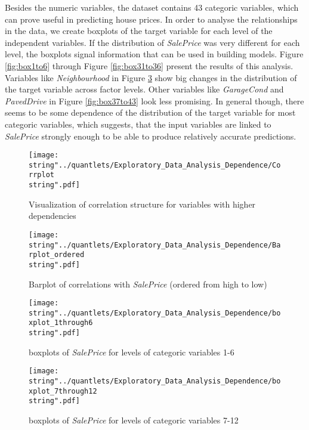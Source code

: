 Besides the numeric variables, the dataset contains 43 categoric variables, which can prove useful in predicting house prices. In order to analyse the relationships in the data, we create boxplots of the target variable for each level of the independent variables. If the distribution of \textit{SalePrice} was very different for each level, the boxplots signal information that can be used in building models. Figure \ref{fig:box1to6} through Figure \ref{fig:box31to36} present the results of this analysis. Variables like \textit{Neighbourhood} in Figure \ref{fig:box7to12} show big changes in the distribution of the target variable across factor levels. Other variables like \textit{GarageCond} and \textit{PavedDrive} in Figure \ref{fig:box37to43} look less promising. In general though, there seems to be some dependence of the distribution of the target variable for most categoric variables, which suggests, that the input variables are  linked to \textit{SalePrice} strongly enough to be able to produce relatively accurate predictions. 
\begin{figure}[H]
  \centering
\texttt{[image: \\string"../quantlets/Exploratory\_Data\_Analysis\_Dependence/Corrplot\\string".pdf]}
  \caption{Visualization of correlation structure for variables with higher dependencies}\label{fig:corrgram}
\end{figure}

\begin{figure}[H]
  \centering
\texttt{[image: \\string"../quantlets/Exploratory\_Data\_Analysis\_Dependence/Barplot\_ordered\\string".pdf]}
  \caption{Barplot of correlations with \textit{SalePrice} (ordered from high to low)}\label{fig:barplot_ordered}
\end{figure}

\begin{figure}[H]
\centering
\begin{minipage}{.5\textwidth}
	\centering
	\texttt{[image: \\string"../quantlets/Exploratory\_Data\_Analysis\_Dependence/boxplot\_1through6\\string".pdf]}
  	\caption{boxplots of \textit{SalePrice} for levels of categoric variables 1-6}
  	\label{fig:box1to6}
\end{minipage}%
\begin{minipage}{.5\textwidth}
\centering
	\texttt{[image: \\string"../quantlets/Exploratory\_Data\_Analysis\_Dependence/boxplot\_7through12\\string".pdf]}
  	\caption{boxplots of \textit{SalePrice} for levels of categoric variables 7-12}
  	\label{fig:box7to12}
\end{minipage}
\end{figure}


